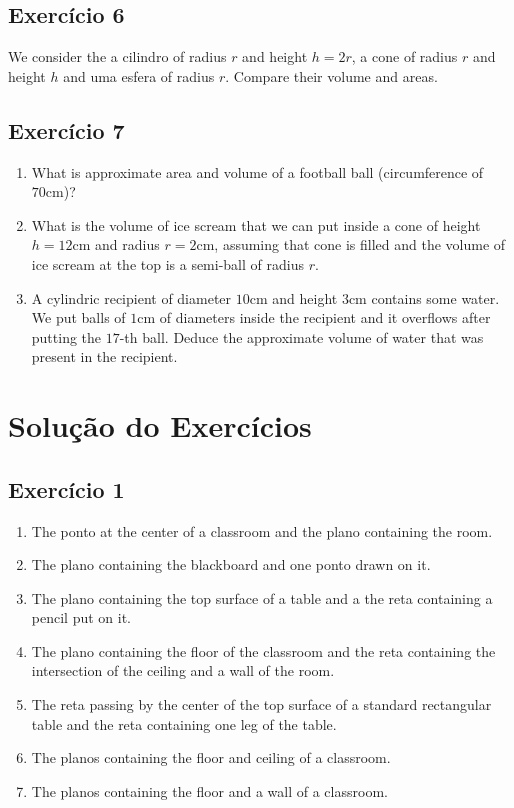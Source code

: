 \subsection*{Exercício 6}

We consider the a cilindro of radius $r$ and height $h=2r$,
a cone of radius $r$ and height $h$ and uma esfera of radius $r$.
Compare their volume and areas.

\subsection*{Exercício 7}

\begin{enumerate}
\item What is approximate
  area and volume of a football ball (circumference of $70\text{cm}$)?
\item What is the volume of ice scream that we can put inside a cone of height
  $h=12\text{cm}$ and
  radius $r=2\text{cm}$, assuming that cone is filled and the volume of ice
  scream at the top is a semi-ball of radius $r$.
\item A cylindric recipient of diameter $10\text{cm}$ and height $3\text{cm}$
  contains some water. We put balls of $1\text{cm}$ of diameters inside the
  recipient and it overflows after putting the $17$-th ball. Deduce the
  approximate volume of water that was present in the recipient.
\end{enumerate}

\section{Solução do Exercícios}

\subsection*{Exercício 1}

\begin{enumerate}
\item The ponto at the center of a classroom and the plano containing the room.
\item The plano containing the blackboard and one ponto drawn on it.
\item The plano containing the top surface of a table and a the reta containing
  a pencil put on it.
\item The plano containing the floor of the classroom and the
  reta containing the intersection of the ceiling and a wall of the room.
\item The reta passing by the center of the top surface of
  a standard rectangular table and the reta containing one leg of the table.
\item The planos containing the floor and ceiling of a classroom.
\item The planos containing the floor and a wall of a classroom.

\end{enumerate}

